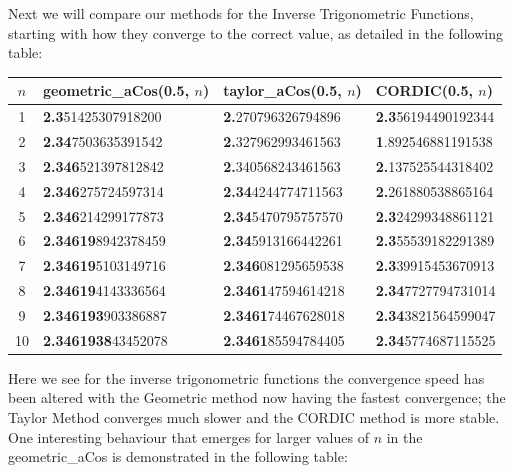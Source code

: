 {Next we will compare our methods for the Inverse Trigonometric Functions, starting with how they converge to the correct value, as detailed in the following table:

{\selectfont
\begin{center}
\begin{tabular}{|c|l|l|l|}
\hline
\(n\) & \textrm{geometric\_aCos(0.5, \(n\))}
	  & \textrm{taylor\_aCos(0.5, \(n\))}
	  & \textrm{CORDIC(0.5, \(n\))}\\\hline
1 & \textbf{2.3}51425307918200
&\textbf{2.}270796326794896
&\textbf{2.3}56194490192344\\\hline
2 & \textbf{2.34}7503635391542
&\textbf{2.}327962993461563
&\textbf{1}.892546881191538\\\hline
3 & \textbf{2.346}521397812842
&\textbf{2.}340568243461563
&\textbf{2.}137525544318402\\\hline
4 & \textbf{2.346}275724597314
&\textbf{2.34}4244774711563
&\textbf{2.}261880538865164\\\hline
5 & \textbf{2.346}214299177873
&\textbf{2.34}5470795757570
&\textbf{2.3}24299348861121\\\hline
6 & \textbf{2.34619}8942378459
&\textbf{2.34}5913166442261
&\textbf{2.3}55539182291389\\\hline
7 & \textbf{2.34619}5103149716
&\textbf{2.346}081295659538
&\textbf{2.3}39915453670913\\\hline
8 & \textbf{2.34619}4143336564
&\textbf{2.3461}47594614218
&\textbf{2.34}7727794731014\\\hline
9 & \textbf{2.346193}903386887
&\textbf{2.3461}74467628018
&\textbf{2.34}3821564599047\\\hline
10& \textbf{2.3461938}43452078
&\textbf{2.3461}85594784405
&\textbf{2.34}5774687115525\\\hline

\end{tabular}
\end{center}}

Here we see for the inverse trigonometric functions the convergence speed has been altered with the Geometric method now having the fastest convergence; the Taylor Method converges much slower and the CORDIC method is more stable. One interesting behaviour that emerges for larger values of \(n\) in the \textrm{geometric\_aCos} is demonstrated in the following table:

}
